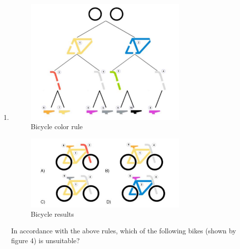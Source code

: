 \documentclass[12pt,titlepage]{article}
\newcommand{\details}[2]{
#1 & #2  \\
}
\begin{document}
\begin{enumerate}
{        \begin{tabularx}{\textwidth}[t]{@{}>{\bfseries}l!{:}X}
        \details{Input}{Stamps as shown on figure 1}
        \details{Output}{Painting as shown on figure 2}
        \details{Other Data}{-}
        \details{Process}{
            \begin{itemize}
                \item Use \textit{the pond} (6) as the first layer because it has the most cut-off part
                \item The next layer would be \textit{the island with a tree} (2)
                \item The third layer is \textit{the beaverland flag} (5)
                \item The next layer is going to be \textit{the beaver house} (4)
                \item Add \textit{the bush} (3) as the fourth layer
                \item Finally, add \textit{the beaver} (1) as the top-most layer
            \end{itemize}
        }
        \end{tabularx}
    }
    \pagebreak
    \item {
        \begin{figure}[h]
            \centering
            \includegraphics[width=8cm]{images/figure8.png}
            \caption{Bicycle color rule}
            \label{fig:bike-parts}
        \end{figure}
        \begin{figure}[h]
            \centering
            \includegraphics[width=8cm]{images/figure9.png}
            \caption{Bicycle results}
            \label{fig:bike-final}
        \end{figure}
        In accordance with the above rules, which of the following bikes (shown by figure 4) is unsuitable?

}
\end{enumerate}
\end{document}
